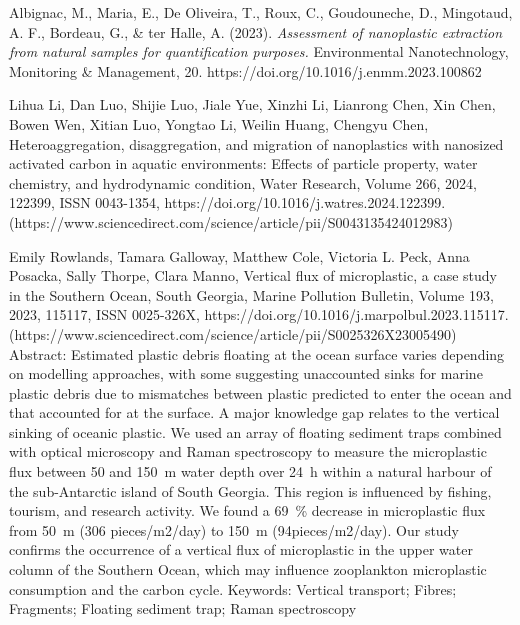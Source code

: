 \documentclass[twocolumn,a4paper,aps,amsmath,amssymb,floatfix,superscriptaddress]{revtex4-2}
\begin{document}
	\begin{thebibliography}{10}
		
		Albignac, M., Maria, E., De Oliveira, T., Roux, C., Goudouneche, D., Mingotaud, A. F., Bordeau, G., \& ter Halle, A. (2023). \textit{Assessment of nanoplastic extraction from natural samples for quantification purposes.} Environmental Nanotechnology, Monitoring \& Management, 20. https://doi.org/10.1016/j.enmm.2023.100862
		
		Lihua Li, Dan Luo, Shijie Luo, Jiale Yue, Xinzhi Li, Lianrong Chen, Xin Chen, Bowen Wen, Xitian Luo, Yongtao Li, Weilin Huang, Chengyu Chen,
		Heteroaggregation, disaggregation, and migration of nanoplastics with nanosized activated carbon in aquatic environments: Effects of particle property, water chemistry, and hydrodynamic condition,
		Water Research,
		Volume 266,
		2024,
		122399,
		ISSN 0043-1354,
		https://doi.org/10.1016/j.watres.2024.122399.
		(https://www.sciencedirect.com/science/article/pii/S0043135424012983)
		
		Emily Rowlands, Tamara Galloway, Matthew Cole, Victoria L. Peck, Anna Posacka, Sally Thorpe, Clara Manno,
		Vertical flux of microplastic, a case study in the Southern Ocean, South Georgia,
		Marine Pollution Bulletin,
		Volume 193,
		2023,
		115117,
		ISSN 0025-326X,
		https://doi.org/10.1016/j.marpolbul.2023.115117.
		(https://www.sciencedirect.com/science/article/pii/S0025326X23005490)
		Abstract: Estimated plastic debris floating at the ocean surface varies depending on modelling approaches, with some suggesting unaccounted sinks for marine plastic debris due to mismatches between plastic predicted to enter the ocean and that accounted for at the surface. A major knowledge gap relates to the vertical sinking of oceanic plastic. We used an array of floating sediment traps combined with optical microscopy and Raman spectroscopy to measure the microplastic flux between 50 and 150 m water depth over 24 h within a natural harbour of the sub-Antarctic island of South Georgia. This region is influenced by fishing, tourism, and research activity. We found a 69 \% decrease in microplastic flux from 50 m (306 pieces/m2/day) to 150 m (94pieces/m2/day). Our study confirms the occurrence of a vertical flux of microplastic in the upper water column of the Southern Ocean, which may influence zooplankton microplastic consumption and the carbon cycle.
		Keywords: Vertical transport; Fibres; Fragments; Floating sediment trap; Raman spectroscopy
		

\end{thebibliography}
\end{document}
